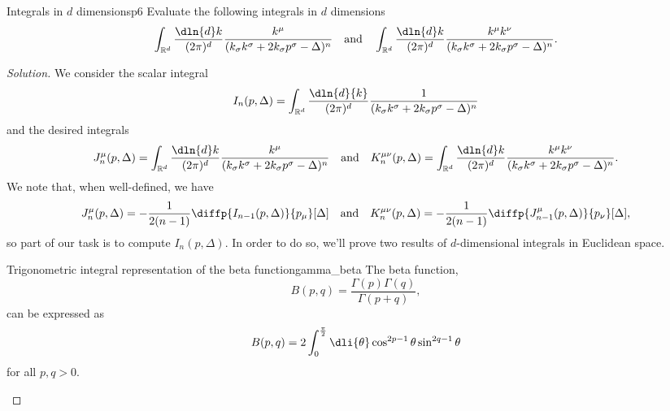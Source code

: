 \begin{problem}{Integrals in \(d\) dimensions}{p6}
   Evaluate the following integrals in \(d\) dimensions
   \begin{equation*}
      \int_{\mathbb{R}^d} \frac{\dln{d}k}{(2\pi)^d} \frac{k^\mu}{(k_\sigma k^\sigma + 2k_\sigma p^\sigma - \Delta)^n}
      \quad\text{and}\quad
      \int_{\mathbb{R}^d} \frac{\dln{d}k}{(2\pi)^d} \frac{k^\mu k^\nu}{(k_\sigma k^\sigma + 2k_\sigma p^\sigma - \Delta)^n}.
   \end{equation*}
\end{problem}
\begin{proof}[Solution]
   We consider the scalar integral
   \begin{equation*}
      I_{n}(p, \Delta) = \int_{\mathbb{R}^d}{\frac{\dln{d}{k}}{(2\pi)^d} \frac{1}{(k_\sigma k^\sigma + 2 k_\sigma p^\sigma - \Delta)^n}}
   \end{equation*}
   and the desired integrals
   \begin{equation*}
      J^\mu_{n}(p, \Delta) = 
      \int_{\mathbb{R}^d} \frac{\dln{d}k}{(2\pi)^d} \frac{k^\mu}{(k_\sigma k^\sigma + 2k_\sigma p^\sigma - \Delta)^n}
      \quad\text{and}\quad
      K_n^{\mu\nu}(p, \Delta) = \int_{\mathbb{R}^d} \frac{\dln{d}k}{(2\pi)^d} \frac{k^\mu k^\nu}{(k_\sigma k^\sigma + 2k_\sigma p^\sigma - \Delta)^n}.
   \end{equation*}
   We note that, when well-defined, we have
   \begin{equation*}
      J_{n}^\mu(p, \Delta) = -\frac{1}{2(n-1)}\diffp{I_{n-1}(p, \Delta)}{p_\mu}[\Delta]\quad\text{and}\quad
      K_{n}^{\mu\nu}(p, \Delta) = -\frac{1}{2(n-1)} \diffp{J_{n-1}^\mu(p, \Delta)}{p_\nu}[\Delta],
   \end{equation*}
   so part of our task is to compute \(I_{n}(p, \Delta).\) In order to do so, we'll prove two results of \(d\)-dimensional integrals in Euclidean space.
   \begin{lemma}{Trigonometric integral representation of the beta function}{gamma_beta}
      The beta function,
      \begin{equation*}
         B(p,q) = \frac{\Gamma(p) \Gamma(q)}{\Gamma(p + q)},
      \end{equation*}
      can be expressed as
      \begin{equation*}
         B(p,q) = 2\int_0^{\frac{\pi}{2}} \dli{\theta} \cos^{2p - 1}\theta \sin^{2q - 1}\theta
      \end{equation*}
      for all \(p, q > 0\).
   \end{lemma}

\end{proof}
